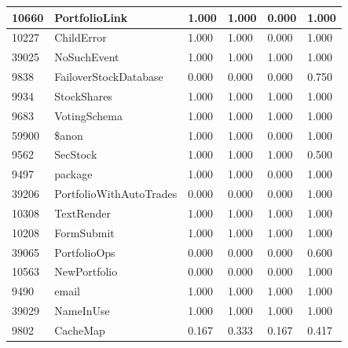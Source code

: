 \documentclass[a4paper]{article}
\newlength{\DUtablewidth} %
\begin{document}
\begin{longtable*}[c]{|p{0.160\DUtablewidth}|p{0.160\DUtablewidth}|p{0.160\DUtablewidth}|p{0.160\DUtablewidth}|p{0.160\DUtablewidth}|p{0.160\DUtablewidth}|}
10660
 & 
PortfolioLink
 & 
1.000
 & 
1.000
 & 
0.000
 & 
1.000
 \\
\hline

10227
 & 
ChildError
 & 
1.000
 & 
1.000
 & 
0.000
 & 
1.000
 \\
\hline

39025
 & 
NoSuchEvent
 & 
1.000
 & 
1.000
 & 
1.000
 & 
1.000
 \\
\hline

9838
 & 
FailoverStockDatabase
 & 
0.000
 & 
0.000
 & 
0.000
 & 
0.750
 \\
\hline

9934
 & 
StockShares
 & 
1.000
 & 
1.000
 & 
1.000
 & 
1.000
 \\
\hline

9683
 & 
VotingSchema
 & 
1.000
 & 
1.000
 & 
1.000
 & 
1.000
 \\
\hline

59900
 & 
\$anon
 & 
1.000
 & 
1.000
 & 
0.000
 & 
1.000
 \\
\hline

9562
 & 
SecStock
 & 
1.000
 & 
1.000
 & 
1.000
 & 
0.500
 \\
\hline

9497
 & 
package
 & 
1.000
 & 
1.000
 & 
0.000
 & 
1.000
 \\
\hline

39206
 & 
PortfolioWithAutoTrades
 & 
0.000
 & 
0.000
 & 
0.000
 & 
1.000
 \\
\hline

10308
 & 
TextRender
 & 
1.000
 & 
1.000
 & 
1.000
 & 
1.000
 \\
\hline

10208
 & 
FormSubmit
 & 
1.000
 & 
1.000
 & 
1.000
 & 
1.000
 \\
\hline

39065
 & 
PortfolioOps
 & 
0.000
 & 
0.000
 & 
0.000
 & 
0.600
 \\
\hline

10563
 & 
NewPortfolio
 & 
0.000
 & 
0.000
 & 
0.000
 & 
1.000
 \\
\hline

9490
 & 
email
 & 
1.000
 & 
1.000
 & 
1.000
 & 
1.000
 \\
\hline

39029
 & 
NameInUse
 & 
1.000
 & 
1.000
 & 
1.000
 & 
1.000
 \\
\hline

9802
 & 
CacheMap
 & 
0.167
 & 
0.333
 & 
0.167
 & 
0.417
 \\
\hline


\end{longtable*}
\end{document}
